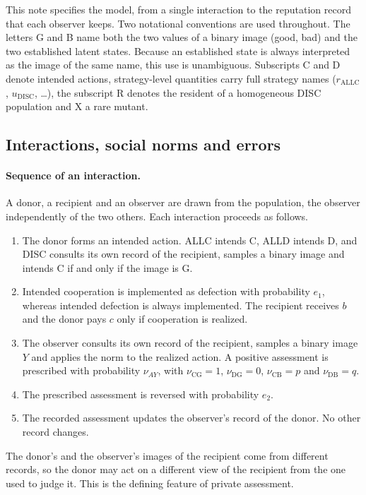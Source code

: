 \documentclass[10pt]{wlscirep}
\newcommand{\ALLC}{\mathrm{ALLC}}
\newcommand{\DISC}{\mathrm{DISC}}
\theoremstyle{plain}
\theoremstyle{remark}
\begin{document}
This note specifies the model, from a single interaction to the reputation record that each observer keeps. Two notational conventions are used throughout. The letters G and B name both the two values of a binary image (good, bad) and the two established latent states. Because an established state is always interpreted as the image of the same name, this use is unambiguous. Subscripts C and D denote intended actions, strategy-level quantities carry full strategy names ($r_{\ALLC}$, $u_{\DISC}$, \ldots), the subscript R denotes the resident of a homogeneous DISC population and X a rare mutant.

\subsection{Interactions, social norms and errors}
\label{si:interactions}

\paragraph{Sequence of an interaction.} A donor, a recipient and an observer are drawn from the population, the observer independently of the two others. Each interaction proceeds as follows.
\begin{enumerate}
\item The donor forms an intended action. ALLC intends C, ALLD intends D, and DISC consults its own record of the recipient, samples a binary image and intends C if and only if the image is G.
\item Intended cooperation is implemented as defection with probability $e_1$, whereas intended defection is always implemented. The recipient receives $b$ and the donor pays $c$ only if cooperation is realized.
\item The observer consults its own record of the recipient, samples a binary image $Y$ and applies the norm to the realized action. A positive assessment is prescribed with probability $\nu_{AY}$, with $\nu_{\mathrm{CG}}=1$, $\nu_{\mathrm{DG}}=0$, $\nu_{\mathrm{CB}}=p$ and $\nu_{\mathrm{DB}}=q$.
\item The prescribed assessment is reversed with probability $e_2$.
\item The recorded assessment updates the observer's record of the donor. No other record changes.
\end{enumerate}
The donor's and the observer's images of the recipient come from different records, so the donor may act on a different view of the recipient from the one used to judge it. This is the defining feature of private assessment.
\end{document}
